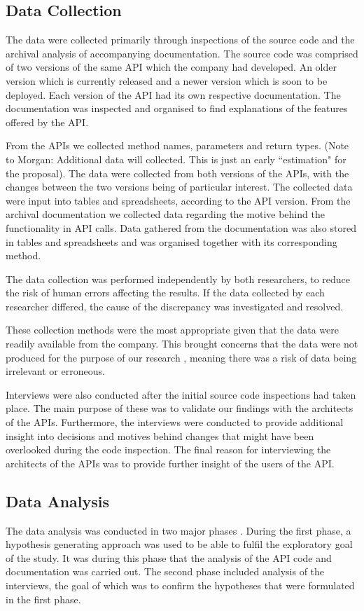 \documentclass[10pt,twocolumn]{article}
\begin{document}
\subsection{Data Collection}
The data were collected primarily through inspections of the source code and the archival analysis of accompanying  documentation. The source code was comprised of two versions of the same API which the company had developed. An older version which is currently released and a newer version which is soon to be deployed. Each version of the API had its own respective documentation. The documentation was inspected and organised to find explanations of the features offered by the API.

From the APIs we collected method names, parameters and return types. (Note to Morgan: Additional data will collected. This is just an early ``estimation" for the proposal). The data were collected from both versions of the APIs, with the changes between the two versions being of particular interest. The collected data were input into tables and spreadsheets, according to the API version. From the archival documentation we collected data regarding the motive behind the functionality in API calls. Data gathered from the documentation was also stored in tables and spreadsheets and was organised together with its corresponding method.

The data collection was performed independently by both researchers, to reduce the risk of human errors affecting the results. If the data collected by each researcher differed, the cause of the discrepancy was investigated and resolved. 

These collection methods were the most appropriate given that the data were readily available from the company. This brought concerns that the data were not produced for the purpose of our research \cite{runeson2009guidelines}, meaning there was a risk of data being irrelevant or erroneous. 

Interviews were also conducted after the initial source code inspections had taken place. The main purpose of these was to validate our findings with the architects of the APIs. Furthermore, the interviews were conducted to provide additional insight into decisions and motives behind changes that might have been overlooked during the code inspection. The final reason for interviewing the architects of the APIs was to provide further insight of the users of the API. 



\subsection{Data Analysis}
The data analysis was conducted in two major phases \cite{andersson2007spiral}. During the first phase, a hypothesis generating approach \cite{seaman1999qualitative} was used to be able to fulfil the exploratory goal of the study. It was during this phase that the analysis of the API code and documentation was carried out. The second phase included analysis of the interviews, the goal of which was to confirm the hypotheses \cite{seaman1999qualitative} that were formulated in the first phase.  
\end{document}
